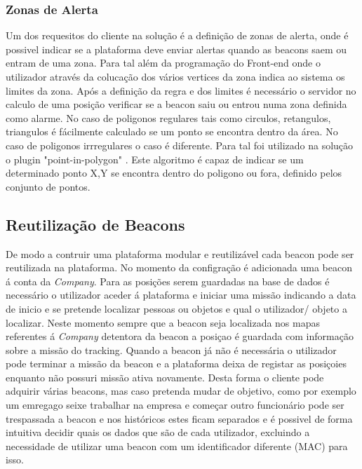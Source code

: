 \subsubsection{Zonas de Alerta}

\par Um dos requesitos do cliente na solução é a definição de zonas de alerta, onde é possivel indicar se a plataforma deve enviar alertas quando as beacons saem ou entram de uma zona. Para tal além da programação do Front-end onde o utilizador através da colucação dos vários vertices da zona indica ao sistema os limites da zona. Após a definição da regra e dos limites é necessário  o servidor no calculo de uma posição verificar se a beacon saiu ou entrou numa zona definida como alarme. No caso de poligonos regulares tais como circulos, retangulos, triangulos é fácilmente calculado se um ponto se encontra dentro da área. No caso de poligonos irrregulares o caso é diferente. Para tal foi utilizado na solução o plugin "point-in-polygon" \cite {pointpoint}. Este algoritmo é capaz de indicar se um determinado ponto X,Y se encontra dentro do poligono ou fora, definido pelos conjunto de pontos.

\subsection{Reutilização de Beacons}

\par De modo a contruir uma plataforma modular e reutilizável cada beacon pode ser reutilizada na plataforma. No momento da configração é adicionada uma beacon á conta da \textit{Company}. Para as posições serem guardadas na base de dados é necessário o utilizador aceder á plataforma e iniciar uma missão indicando a data de inicio e se pretende localizar pessoas ou objetos e qual o utilizador/ objeto a localizar. Neste momento sempre que a beacon seja localizada nos mapas referentes á \textit{Company} detentora da beacon a posiçao é guardada com informação sobre a missão do tracking. Quando a beacon já não é necessária o utilizador pode terminar a missão da beacon e a plataforma deixa de registar as posiçoies enquanto não possuri missão ativa novamente. Desta forma o cliente pode adquirir várias beacons, mas caso pretenda mudar de objetivo, como por exemplo um emregago seixe trabalhar na empresa e começar outro funcionário pode ser trespassada a beacon e nos históricos estes ficam separados e é possivel de forma intuitiva decidir quais os dados que são de cada utilizador, excluindo a necessidade de utilizar uma beacon com um identificador diferente (MAC) para isso.
\par
